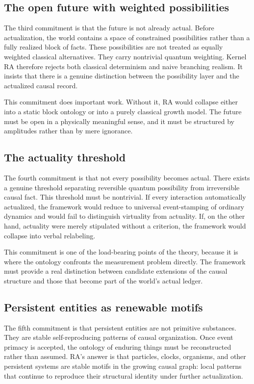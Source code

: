 \documentclass[11pt]{article}
\begin{document}
\subsection{The open future with weighted possibilities}
The third commitment is that the future is not already actual. Before actualization, the world contains a space of constrained possibilities rather than a fully realized block of facts. These possibilities are not treated as equally weighted classical alternatives. They carry nontrivial quantum weighting. Kernel RA therefore rejects both classical determinism and naive branching realism. It insists that there is a genuine distinction between the possibility layer and the actualized causal record.

This commitment does important work. Without it, RA would collapse either into a static block ontology or into a purely classical growth model. The future must be open in a physically meaningful sense, and it must be structured by amplitudes rather than by mere ignorance.

\subsection{The actuality threshold}
The fourth commitment is that not every possibility becomes actual. There exists a genuine threshold separating reversible quantum possibility from irreversible causal fact. This threshold must be nontrivial. If every interaction automatically actualized, the framework would reduce to universal event-stamping of ordinary dynamics and would fail to distinguish virtuality from actuality. If, on the other hand, actuality were merely stipulated without a criterion, the framework would collapse into verbal relabeling.

This commitment is one of the load-bearing points of the theory, because it is where the ontology confronts the measurement problem directly. The framework must provide a real distinction between candidate extensions of the causal structure and those that become part of the world's actual ledger.

\subsection{Persistent entities as renewable motifs}
The fifth commitment is that persistent entities are not primitive substances. They are stable self-reproducing patterns of causal organization. Once event primacy is accepted, the ontology of enduring things must be reconstructed rather than assumed. RA's answer is that particles, clocks, organisms, and other persistent systems are stable motifs in the growing causal graph: local patterns that continue to reproduce their structural identity under further actualization.
\end{document}
